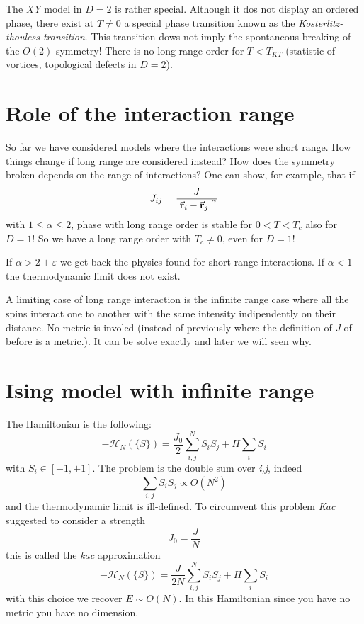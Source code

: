\documentclass[../main/main.tex]{subfiles}
\begin{document}
\begin{remark}
The \emph{XY} model in \( D=2 \) is rather special. Although it dos not display an ordered phase, there exist at \( T \neq 0 \) a special phase transition known as the \emph{Kosterlitz-thouless transition}. This transition dows not imply the spontaneous breaking of the \( O(2) \) symmetry! There is no long range order for \( T<T_{KT} \) (statistic of vortices, topological defects in \( D=2 \)).
\end{remark}


\section{Role of the interaction range}
So far we have considered models where the interactions were short range. How things change if long range are considered instead? How does the symmetry broken depends on the range of interactions? One can show, for example, that if
\begin{equation}
  J_{ij} = \frac{J}{\abs{\va{r}_i - \va{r}_j}^\alpha  }
\end{equation}
with \( 1 \le \alpha \le 2 \), phase with long range order is stable for \( 0 < T < T_c \) also for \( D=1 \)!   So we have a long range order with \( T_c \neq 0 \), even for \( D=1 \)!

\begin{remark}
If \( \alpha > 2 + \varepsilon  \) we get back the physics found for short range interactions. If \( \alpha <1 \) the thermodynamic limit does not exist.
\end{remark}
A limiting case of long range interaction is the infinite range case where all the spins interact one to another with the same intensity indipendently on their distance. No metric is involed (instead of previously where the definition of \emph{J} of before is a metric.). It can be solve exactly and later we will seen why.


\section{Ising model with infinite range}

The Hamiltonian is the following:
\begin{equation}
  -\mathcal{H}_N (\{ S \} ) = \frac{J_0}{2} \sum_{i,j}^{N} S_i S_j + H \sum_{i}^{}  S_i
\end{equation}
with \( S_i \in [-1,+1] \). The problem is the double sum over \emph{i,j}, indeed
\begin{equation}
  \sum_{i,j}^{} S_i S_j \propto O(N^2)
\end{equation}
and the thermodynamic limit is ill-defined. To circumvent this problem \emph{Kac}  suggested to consider a strength
\begin{equation}
  J_0 = \frac{J}{N}
\end{equation}
this is called the \emph{kac} approximation
\begin{equation}
  -\mathcal{H}_N (\{ S \} ) = \frac{J}{2N} \sum_{i,j}^{N} S_i S_j + H \sum_{i}^{}  S_i
\end{equation}
with this choice we recover \( E \sim O(N) \).  In this Hamiltonian since you have no metric you have no dimension.
\end{document}

